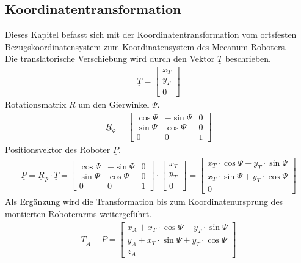 \subsection{Koordinatentransformation}
Dieses Kapitel befasst sich mit der Koordinatentransformation vom ortsfesten Bezugskoordinatensystem zum Koordinatensystem des Mecanum-Roboters. \\
Die translatorische Verschiebung wird durch den Vektor $\underline T$ beschrieben.
\begin{align*}
\underline T =
\begin{bmatrix}
x_{T}\\
y_{T}\\
0
\end{bmatrix}
\end{align*}
Rotationsmatrix $\underline R$ um den Gierwinkel $\Psi$.
\begin{align*}
 \underline R_{\Psi} =
\begin{bmatrix}
  \cos{\Psi} & -\sin{\Psi} & 0\\
  \sin{\Psi} & \cos{\Psi} & 0\\
  0 & 0 & 1
\end{bmatrix}
\end{align*}
Positionsvektor des Roboter $\underline P$.
\begin{align*}
\underline P = \underline R_{\Psi} \cdot \underline T =
\begin{bmatrix}
  \cos{\Psi} & -\sin{\Psi} & 0\\
  \sin{\Psi} & \cos{\Psi} & 0\\
  0 & 0 & 1
\end{bmatrix}\cdot
\begin{bmatrix}
x_{T}\\
y_{T}\\
0
\end{bmatrix}=
\begin{bmatrix}
x_{T} \cdot \cos{\Psi}-y_{T} \cdot \sin{\Psi}\\
x_{T} \cdot \sin{\Psi}+y_{T}  \cdot \cos{\Psi}\\
0
\end{bmatrix}
\end{align*}
Als Ergänzung wird die Transformation bis zum Koordinatenursprung des montierten Roboterarms weitergeführt.
\begin{align*}
\underline T_{A} + \underline P =
\begin{bmatrix}
x_{A} + x_{T} \cdot \cos{\Psi}-y_{T} \cdot \sin{\Psi}\\
y_{A} + x_{T} \cdot \sin{\Psi}+y_{T}  \cdot \cos{\Psi}\\
z_{A}
\end{bmatrix}
\end{align*}